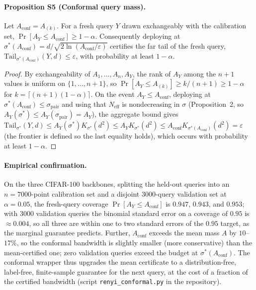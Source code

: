 \documentclass[10pt,twocolumn]{article}
\newcommand{\Neff}{N_{\mathrm{eff}}}
\begin{document}
\paragraph{Proposition S5 (Conformal query mass).} Let $A_{\mathrm{conf}}=A_{(k)}$. For a fresh query $Y$ drawn exchangeably with the calibration set, $\Pr[A_Y\le A_{\mathrm{conf}}]\ge1-\alpha$. Consequently deploying at $\sigma^*(A_{\mathrm{conf}})=d/\sqrt{2\ln(A_{\mathrm{conf}}/\varepsilon)}$ certifies the far tail of the fresh query, $\mathrm{Tail}_{\sigma^*(A_{\mathrm{conf}})}(Y,d)\le\varepsilon$, with probability at least $1-\alpha$.
\begin{proof}
By exchangeability of $A_1,\dots,A_n,A_Y$, the rank of $A_Y$ among the $n+1$ values is uniform on $\{1,\dots,n+1\}$, so $\Pr[A_Y\le A_{(k)}]\ge k/(n+1)\ge1-\alpha$ for $k=\lceil(n+1)(1-\alpha)\rceil$. On the event $A_Y\le A_{\mathrm{conf}}$, deploying at $\sigma^*(A_{\mathrm{conf}})\le\sigma_{\mathrm{pair}}$ and using that $\Neff$ is nondecreasing in $\sigma$ (Proposition~2, so $A_Y(\sigma^*)\le A_Y(\sigma_{\mathrm{pair}})=A_Y$), the aggregate bound gives $\mathrm{Tail}_{\sigma^*}(Y,d)\le A_Y(\sigma^*)K_{\sigma^*}(d^2)\le A_Y K_{\sigma^*}(d^2)\le A_{\mathrm{conf}}K_{\sigma^*(A_{\mathrm{conf}})}(d^2)=\varepsilon$ (the frontier is defined so the last equality holds), which occurs with probability at least $1-\alpha$.
\end{proof}
\paragraph{Empirical confirmation.} On the three CIFAR-100 backbones, splitting the held-out queries into an $n=7000$-point calibration set and a disjoint $3000$-query validation set at $\alpha=0.05$, the fresh-query coverage $\Pr[A_Y\le A_{\mathrm{conf}}]$ is $0.947$, $0.943$, and $0.953$; with $3000$ validation queries the binomial standard error on a coverage of $0.95$ is $\approx0.004$, so all three are within one to two standard errors of the $0.95$ target, as the marginal guarantee predicts. Further, $A_{\mathrm{conf}}$ exceeds the mean mass $A$ by $10$--$17\%$, so the conformal bandwidth is slightly smaller (more conservative) than the mean-certified one; zero validation queries exceed the budget at $\sigma^*(A_{\mathrm{conf}})$. The conformal wrapper thus upgrades the mean certificate to a distribution-free, label-free, finite-sample guarantee for the next query, at the cost of a fraction of the certified bandwidth (script \texttt{renyi\_conformal.py} in the repository).
\end{document}
